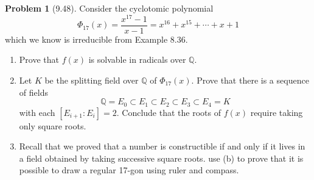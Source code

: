 \documentclass[12pt]{article}
\theoremstyle{definition}
\newtheorem{problem}{Problem}
\begin{document}
\begin{problem}[9.48]
    Consider the cyclotomic polynomial
    \[
        \Phi_17(x) = \frac{x^17 - 1}{x - 1} = x^16 + x^15 + \cdots + x + 1
    \]
    which we know is irreducible from Example 8.36.
    \begin{enumerate}[label=(\alph*)]
        \item Prove that $f(x)$ is solvable in radicals over $\mathbb{Q}$.
        \begin{solution}

        \end{solution}

        \item Let $K$ be the splitting field over $\mathbb{Q}$ of $\Phi_17(x)$. Prove that there is a sequence of fields
              \[
                  \mathbb{Q} = E_0 \subset E_1 \subset E_2 \subset E_3 \subset E_4 = K
              \]
              with each $[E_{i+1} : E_i] = 2$. Conclude that the roots of $f(x)$ require taking only square roots.
        \begin{solution}

        \end{solution}
        
        \item Recall that we proved that a number is constructible if and only if it lives in a field obtained by taking successive square roots.
              use (b) to prove that it is possible to draw a regular 17-gon using ruler and compass.
        \begin{solution}

        \end{solution}
    \end{enumerate}
\end{problem}
\end{document}
